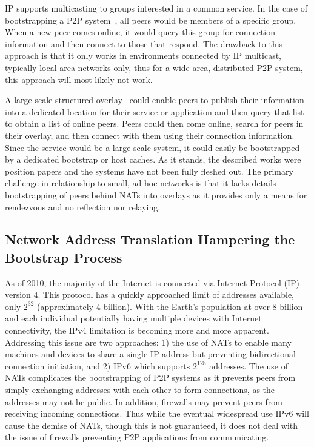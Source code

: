 \documentclass[conference]{IEEEtran}
\begin{document}
IP supports multicasting to groups interested in a common service.  In the case
of bootstrapping a P2P system~\cite{pastry, locality_aware}, all peers would be
members of a specific group.  When a new peer comes online, it would query this
group for connection information and then connect to those that respond.  The
drawback to this approach is that it only works in environments connected by IP
multicast, typically local area networks only, thus for a wide-area,
distributed P2P system, this approach will most likely not work.

A large-scale structured overlay~\cite{one_ring, p2p_bootstrap} could enable
peers to publish their information into a dedicated location for their service
or application and then query that list to obtain a list of online peers.
Peers could then come online, search for peers in their overlay, and then
connect with them using their connection information.  Since the service would
be a large-scale system, it could easily be bootstrapped by a dedicated
bootstrap or host caches.  As it stands, the described works were position
papers and the systems have not been fully fleshed out.  The primary challenge
in relationship to small, ad hoc networks is that it lacks details
bootstrapping of peers behind NATs into overlays as it provides only a means
for rendezvous and no reflection nor relaying.

\subsection{Network Address Translation Hampering the Bootstrap Process}

As of 2010, the majority of the Internet is connected via Internet Protocol
(IP) version 4.  This protocol has a quickly approached limit of addresses
available,  only $2^{32}$ (approximately 4 billion).  With the Earth's
population at over 8 billion and each individual potentially having multiple
devices with Internet connectivity, the IPv4 limitation is becoming more and
more apparent.  Addressing this issue are two approaches:  1) the use of NATs
to enable many machines and devices to share a single IP address but preventing
bidirectional connection initiation, and 2) IPv6 which supports $2^{128}$
addresses.  The use of NATs complicates the bootstrapping of P2P systems as it
prevents peers from simply exchanging addresses with each other to form
connections, as the addresses may not be public.  In addition, firewalls may
prevent peers from receiving incoming connections.  Thus while the eventual
widespread use IPv6 will cause the demise of NATs, though this is not
guaranteed, it does not deal with the issue of firewalls preventing P2P
applications from communicating.
\end{document}
